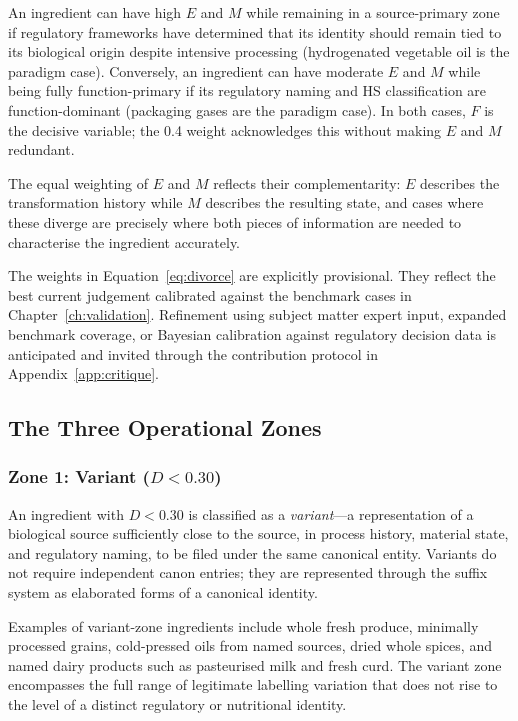\documentclass[12pt,a3paper]{article}
\begin{document}
An ingredient can have high $E$ and $M$ while remaining in a source-primary zone if regulatory frameworks have determined that its identity should remain tied to its biological origin despite intensive processing (hydrogenated vegetable oil is the paradigm case). Conversely, an ingredient can have moderate $E$ and $M$ while being fully function-primary if its regulatory naming and HS classification are function-dominant (packaging gases are the paradigm case). In both cases, $F$ is the decisive variable; the 0.4 weight acknowledges this without making $E$ and $M$ redundant.

The equal weighting of $E$ and $M$ reflects their complementarity: $E$ describes the transformation history while $M$ describes the resulting state, and cases where these diverge are precisely where both pieces of information are needed to characterise the ingredient accurately.

The weights in Equation~\ref{eq:divorce} are explicitly provisional. They reflect the best current judgement calibrated against the benchmark cases in Chapter~\ref{ch:validation}. Refinement using subject matter expert input, expanded benchmark coverage, or Bayesian calibration against regulatory decision data is anticipated and invited through the contribution protocol in Appendix~\ref{app:critique}.

\subsection{The Three Operational Zones}

\subsubsection{Zone 1: Variant ($D < 0.30$)}

An ingredient with $D < 0.30$ is classified as a \textit{variant}---a representation of a biological source sufficiently close to the source, in process history, material state, and regulatory naming, to be filed under the same canonical entity. Variants do not require independent canon entries; they are represented through the suffix system as elaborated forms of a canonical identity.

Examples of variant-zone ingredients include whole fresh produce, minimally processed grains, cold-pressed oils from named sources, dried whole spices, and named dairy products such as pasteurised milk and fresh curd. The variant zone encompasses the full range of legitimate labelling variation that does not rise to the level of a distinct regulatory or nutritional identity.
\end{document}
